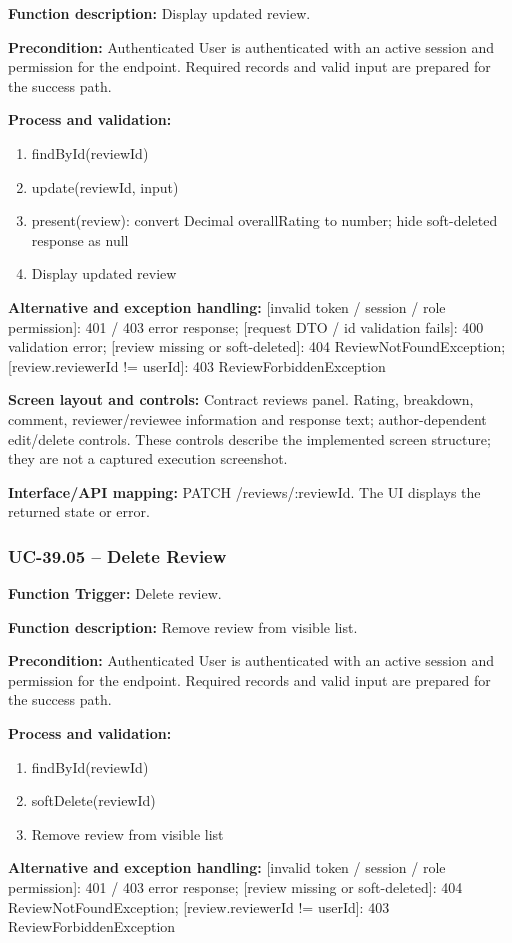 \textbf{Function description:} Display updated review.

\textbf{Precondition:} Authenticated User is authenticated with an active session and permission for the endpoint. Required records and valid input are prepared for the success path.

\textbf{Process and validation:}
\begin{enumerate}
\item find\allowbreak{}By\allowbreak{}Id(review\allowbreak{}Id)
\item update(review\allowbreak{}Id, input)
\item present(review): convert Decimal overall\allowbreak{}Rating to number; hide soft-deleted response as null
\item Display updated review
\end{enumerate}
\textbf{Alternative and exception handling:} [invalid token /\allowbreak{} session /\allowbreak{} role permission]: 401 /\allowbreak{} 403 error response; [request DTO /\allowbreak{} id validation fails]: 400 validation error; [review missing or soft-deleted]: 404 Review\allowbreak{}Not\allowbreak{}Found\allowbreak{}Exception; [review.reviewer\allowbreak{}Id !=\allowbreak{} user\allowbreak{}Id]: 403 Review\allowbreak{}Forbidden\allowbreak{}Exception

\textbf{Screen layout and controls:} Contract reviews panel. Rating, breakdown, comment, reviewer/\allowbreak{}reviewee information and response text; author-dependent edit/\allowbreak{}delete controls. These controls describe the implemented screen structure; they are not a captured execution screenshot.

\textbf{Interface/\allowbreak{}API mapping:} PATCH /\allowbreak{}reviews/\allowbreak{}:review\allowbreak{}Id. The UI displays the returned state or error.

\subsubsection{UC-39.05 -- Delete Review}
\textbf{Function Trigger:} Delete review.

\textbf{Function description:} Remove review from visible list.

\textbf{Precondition:} Authenticated User is authenticated with an active session and permission for the endpoint. Required records and valid input are prepared for the success path.

\textbf{Process and validation:}
\begin{enumerate}
\item find\allowbreak{}By\allowbreak{}Id(review\allowbreak{}Id)
\item soft\allowbreak{}Delete(review\allowbreak{}Id)
\item Remove review from visible list
\end{enumerate}
\textbf{Alternative and exception handling:} [invalid token /\allowbreak{} session /\allowbreak{} role permission]: 401 /\allowbreak{} 403 error response; [review missing or soft-deleted]: 404 Review\allowbreak{}Not\allowbreak{}Found\allowbreak{}Exception; [review.reviewer\allowbreak{}Id !=\allowbreak{} user\allowbreak{}Id]: 403 Review\allowbreak{}Forbidden\allowbreak{}Exception

